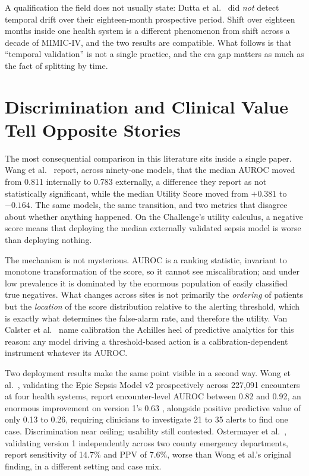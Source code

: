 A qualification the field does not usually state: Dutta et al.\
\cite{dutta2026performance} did \emph{not} detect temporal drift over their
eighteen-month prospective period. Shift over eighteen months inside one health
system is a different phenomenon from shift across a decade of MIMIC-IV, and
the two results are compatible. What follows is that ``temporal validation''
is not a single practice, and the era gap matters as much as the fact of
splitting by time.


\section{Discrimination and Clinical Value Tell Opposite Stories}
\label{sec:auroc_illusion}

The most consequential comparison in this literature sits inside a single
paper. Wang et al.\ \cite{wang2025srpm} report, across ninety-one models, that
the median AUROC moved from 0.811 internally to 0.783 externally, a
difference they report as not statistically significant, while the median
Utility Score moved from $+0.381$ to $-0.164$. The same models, the same
transition, and two metrics that disagree about whether anything happened. On
the Challenge's utility calculus, a negative score means that deploying the
median externally validated sepsis model is worse than deploying nothing.

The mechanism is not mysterious. AUROC is a ranking statistic, invariant to
monotone transformation of the score, so it cannot see miscalibration; and
under low prevalence it is dominated by the enormous population of easily
classified true negatives. What changes across sites is not primarily the
\emph{ordering} of patients but the \emph{location} of the score distribution
relative to the alerting threshold, which is exactly what determines the
false-alarm rate, and therefore the utility. Van Calster et al.\
\cite{vancalster2019calibration} name calibration the Achilles heel of
predictive analytics for this reason: any model driving a threshold-based
action is a calibration-dependent instrument whatever its AUROC.

Two deployment results make the same point visible in a second way. Wong et
al.\ \cite{wong2026epic}, validating the Epic Sepsis Model v2 prospectively
across 227,091 encounters at four health systems, report encounter-level AUROC
between 0.82 and 0.92, an enormous improvement on version 1's 0.63
\cite{wong2021epic}, alongside positive predictive value of only 0.13 to
0.26, requiring clinicians to investigate 21 to 35 alerts to find one case.
Discrimination near ceiling; usability still contested. Ostermayer et al.\
\cite{ostermayer2024external}, validating version 1 independently across two
county emergency departments, report sensitivity of 14.7\% and PPV of 7.6\%,
worse than Wong et al.'s original finding, in a different setting and case mix.

